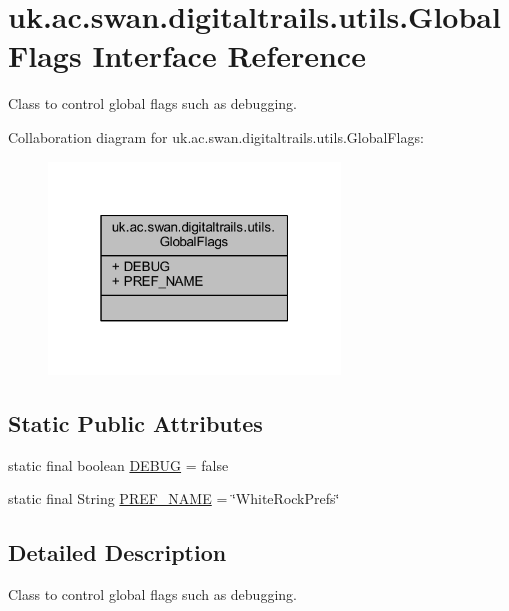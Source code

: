 \hypertarget{interfaceuk_1_1ac_1_1swan_1_1digitaltrails_1_1utils_1_1_global_flags}{\section{uk.\+ac.\+swan.\+digitaltrails.\+utils.\+Global\+Flags Interface Reference}
\label{interfaceuk_1_1ac_1_1swan_1_1digitaltrails_1_1utils_1_1_global_flags}
}


Class to control global flags such as debugging.  




Collaboration diagram for uk.\+ac.\+swan.\+digitaltrails.\+utils.\+Global\+Flags\+:
\nopagebreak
\begin{figure}[H]
\begin{center}
\leavevmode
\includegraphics[width=220pt]{interfaceuk_1_1ac_1_1swan_1_1digitaltrails_1_1utils_1_1_global_flags__coll__graph}
\end{center}
\end{figure}
\subsection*{Static Public Attributes}
\begin{DoxyCompactItemize}
\item 
static final boolean \hyperlink{interfaceuk_1_1ac_1_1swan_1_1digitaltrails_1_1utils_1_1_global_flags_ab66530eac1afabd42e6dfa7819cba196}{D\+E\+B\+U\+G} = false
\item 
static final String \hyperlink{interfaceuk_1_1ac_1_1swan_1_1digitaltrails_1_1utils_1_1_global_flags_a95ec83059f5234100d715662a0c79ba8}{P\+R\+E\+F\+\_\+\+N\+A\+M\+E} = \char`\"{}White\+Rock\+Prefs\char`\"{}
\end{DoxyCompactItemize}


\subsection{Detailed Description}
Class to control global flags such as debugging. 

